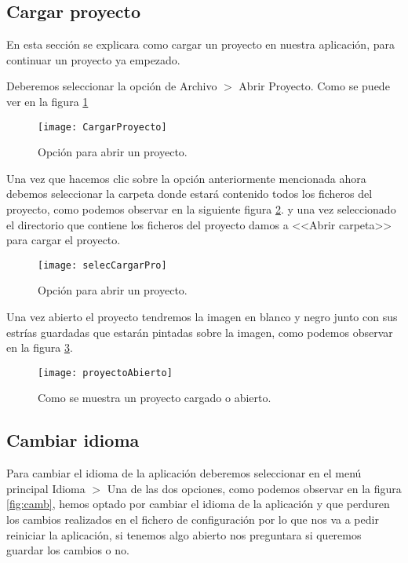 \label{modo:2}
\subsection{Cargar proyecto}
En esta sección se explicara como cargar un proyecto en nuestra aplicación, para continuar un proyecto ya empezado.

Deberemos seleccionar la opción de Archivo  $>$ Abrir Proyecto. Como se puede ver en la figura \ref{fig:cargarPro}


\begin{figure}[h]
\centering
\texttt{[image: CargarProyecto]}
\caption{Opción para abrir un proyecto.}
\label{fig:cargarPro}
\end{figure}

Una vez que hacemos clic sobre la opción anteriormente mencionada ahora debemos seleccionar la carpeta donde estará contenido todos los ficheros del proyecto, como podemos observar en la siguiente figura \ref{fig:selecCargarPro}. y una vez seleccionado el directorio que contiene los ficheros del proyecto damos a <<Abrir carpeta>> para cargar el proyecto. 



\begin{figure}[h]
\centering
\texttt{[image: selecCargarPro]}
\caption{Opción para abrir un proyecto.}
\label{fig:selecCargarPro}
\end{figure}

Una vez abierto el proyecto tendremos la imagen en blanco y negro junto con sus estrías guardadas que estarán pintadas sobre la imagen, como podemos observar en la figura \ref{fig:proyectoAbierto}.


\begin{figure}[h]
\centering
\texttt{[image: proyectoAbierto]}
\caption{Como se muestra un proyecto cargado o abierto.}
\label{fig:proyectoAbierto}
\end{figure}

\label{modo:idioma}
\subsection{Cambiar idioma}
Para cambiar el idioma de la aplicación deberemos seleccionar en el menú principal Idioma $>$ Una de las dos opciones, como podemos observar en la figura \ref{fig:camb}, hemos optado por cambiar el idioma de la aplicación y que perduren los cambios realizados en el fichero de configuración por lo que nos va a pedir reiniciar la aplicación, si tenemos algo abierto nos preguntara si queremos guardar los cambios o no.

